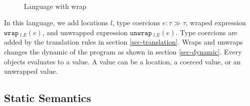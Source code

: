 \documentclass{article}
\theoremstyle{definition}
\newcommand{\keywadj}[1]{\mathtt{#1}}
\newcommand{\keyw}[1]{\keywadj{#1}~}
\begin{document}
\begin{figure}[H]
{\[\begin{array}{lll}
\begin{array}{lllr}
\
\end{array}
\end{array}
\]
}
\caption{Language with wrap}
\end{figure}

In this language, we add locations $l$, type coercions $e: \tau \gg \tau$, wraped expression $\keyw{wrap}_{l.E}(e)$, and unwrapped expression $\keyw{unwrap}_{l.E}(e)$. Type coercions are added by the translation rules in section \ref{sec-translation}. Wraps and unwraps changes the dynamic of the program as shown in section \ref{sec-dynamic}. Every objects evaluates to a value. A value can be a location, a coerced value, or an unwrapped value.


\subsection{ Static Semantics}
\end{document}
